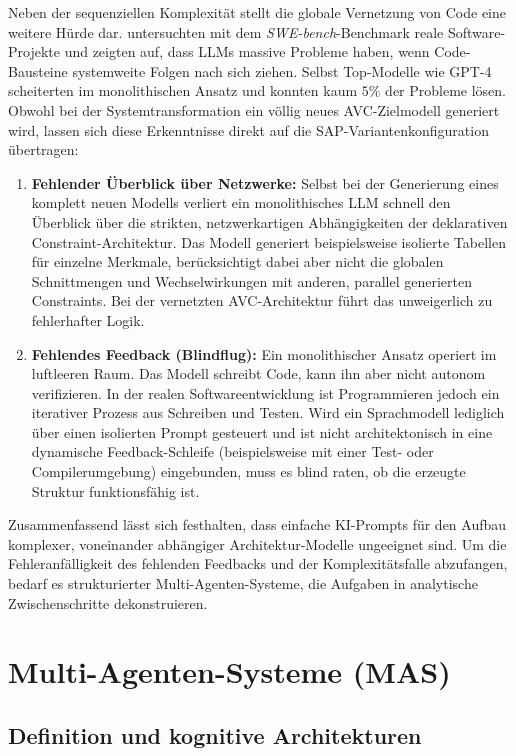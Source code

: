 Neben der sequenziellen Komplexität stellt die globale Vernetzung von Code eine weitere Hürde dar. \textcite{jimenezSwebenchCanLanguage2024} untersuchten mit dem \textit{SWE-bench}-Benchmark reale Software-Projekte und zeigten auf, dass \ac{LLMs} massive Probleme haben, wenn Code-Bausteine systemweite Folgen nach sich ziehen. Selbst Top-Modelle wie GPT-4 scheiterten im monolithischen Ansatz und konnten kaum $5\%$ der Probleme lösen.  Obwohl bei der Systemtransformation ein völlig neues AVC-Zielmodell generiert wird, lassen sich diese Erkenntnisse direkt auf die SAP-Variantenkonfiguration übertragen:
\begin{enumerate}
\item \textbf{Fehlender Überblick über Netzwerke:} Selbst bei der Generierung eines komplett neuen Modells verliert ein monolithisches LLM schnell den Überblick über die strikten, netzwerkartigen Abhängigkeiten der deklarativen Constraint-Architektur. Das Modell generiert beispielsweise isolierte Tabellen für einzelne Merkmale, berücksichtigt dabei aber nicht die globalen Schnittmengen und Wechselwirkungen mit anderen, parallel generierten Constraints. Bei der vernetzten \ac{AVC}-Architektur führt das unweigerlich zu fehlerhafter Logik.
\item \textbf{Fehlendes Feedback (Blindflug):} Ein monolithischer Ansatz operiert im luftleeren Raum. Das Modell schreibt Code, kann ihn aber nicht autonom verifizieren. In der realen Softwareentwicklung ist Programmieren jedoch ein iterativer Prozess aus Schreiben und Testen. Wird ein Sprachmodell lediglich über einen isolierten Prompt gesteuert und ist nicht architektonisch in eine dynamische Feedback-Schleife (beispielsweise mit einer Test- oder Compilerumgebung) eingebunden, muss es blind raten, ob die erzeugte Struktur funktionsfähig ist.
\end{enumerate}  Zusammenfassend lässt sich festhalten, dass einfache KI-Prompts für den Aufbau komplexer, voneinander abhängiger Architektur-Modelle ungeeignet sind. Um die Fehleranfälligkeit des fehlenden Feedbacks und der Komplexitätsfalle abzufangen, bedarf es strukturierter Multi-Agenten-Systeme, die Aufgaben in analytische Zwischenschritte dekonstruieren.  

\section{Multi-Agenten-Systeme (\ac{MAS})}
\subsection{Definition und kognitive Architekturen}
\label{subsec:definition_und_kognitive_architekturen}

